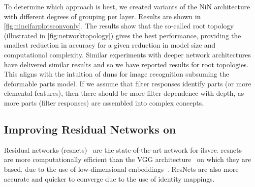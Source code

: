\documentclass[thesis]{subfiles}
\begin{document}
	To determine which approach is best, we created variants of the NiN architecture with different degrees of grouping per layer. Results are shown in \cref{fig:nincifarplotsconvonly}. The results show that the so-called root topology (illustrated in \cref{fig:networktopology}) gives the best performance, providing the smallest reduction in accuracy for a given reduction in model size and computational complexity. Similar experiments with deeper network architectures have delivered similar results and so we have reported results for root topologies. This aligns with the intuition of \glspl{dnn} for image recognition subsuming the deformable parts model. If we assume that filter responses identify parts (or more elemental features), then there should be more filter dependence with depth, as more parts (filter responses) are assembled into complex concepts.
	
	\subsection{Improving Residual Networks on }
	Residual networks (\gls{resnet}s)~\citep{He2015} are the state-of-the-art network for \gls{ilsvrc}\@. \Glspl{resnet} are more computationally efficient than the VGG architecture~\citep{Simonyan2014verydeep} on which they are based, due to the use of low-dimensional embeddings~\citep{Lin2013NiN}. ResNets are also more accurate and quicker to converge due to the use of identity mappings.
	
\end{document}
